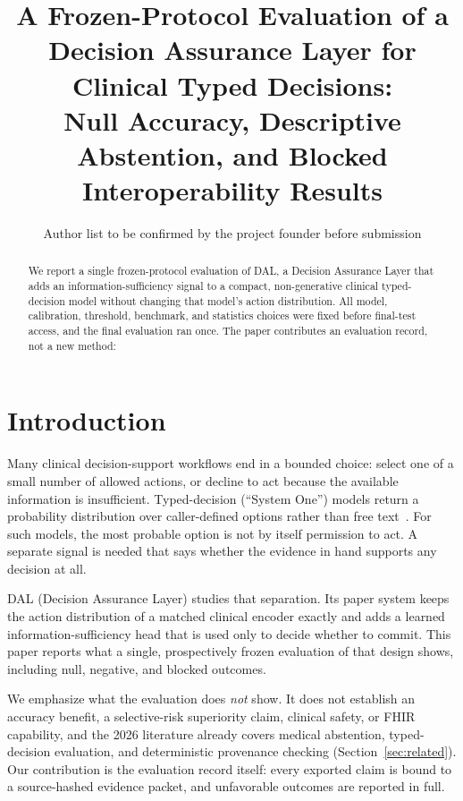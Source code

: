 \documentclass[11pt]{article}
\title{A Frozen-Protocol Evaluation of a Decision Assurance Layer for Clinical Typed Decisions:\\
Null Accuracy, Descriptive Abstention, and Blocked Interoperability Results}
\author{Author list to be confirmed by the project founder before submission}
\date{}
\begin{document}
\maketitle

\begin{abstract}
We report a single frozen-protocol evaluation of DAL, a Decision Assurance Layer that adds an
information-sufficiency signal to a compact, non-generative clinical typed-decision model without
changing that model's action distribution. All model, calibration, threshold, benchmark, and
statistics choices were fixed before final-test access, and the final evaluation ran once.
   
 The paper contributes an evaluation record, not a new method:
\end{abstract}

\section{Introduction}

Many clinical decision-support workflows end in a bounded choice: select one of a small number of
allowed actions, or decline to act because the available information is insufficient. Typed-decision
(``System One'') models return a probability distribution over caller-defined options rather than free
text~\citep{jev_blog,laya_repo,decider_repo,clm_repo}. For such models, the most probable option is not by itself
permission to act. A separate signal is needed that says whether the evidence in hand supports any
decision at all.

DAL (Decision Assurance Layer) studies that separation. Its paper system keeps the action
distribution of a matched clinical encoder exactly and adds a learned information-sufficiency head
that is used only to decide whether to commit. This paper reports what a single, prospectively frozen
evaluation of that design shows, including null, negative, and blocked outcomes.

We emphasize what the evaluation does \emph{not} show. It does not establish an accuracy benefit, a
selective-risk superiority claim, clinical safety, or FHIR capability, and the 2026 literature already
covers medical abstention, typed-decision evaluation, and deterministic provenance checking
(Section~\ref{sec:related}). Our contribution is the evaluation record itself: every exported claim is
bound to a source-hashed evidence packet, and unfavorable outcomes are reported in full.
\end{document}
